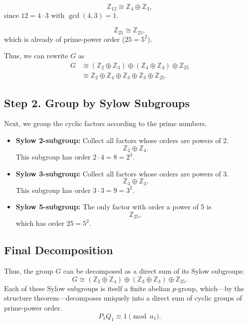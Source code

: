 \documentclass[12pt]{article}
\theoremstyle{definition} %
\theoremstyle{plain} %
\begin{document}
    \[
    \mathbb{Z}_{12} \cong \mathbb{Z}_4 \oplus \mathbb{Z}_3,
    \]
    since \(12 = 4 \cdot 3\) with \(\gcd(4,3)=1\).
    
    \[
    \mathbb{Z}_{25} \cong \mathbb{Z}_{25},
    \]
    which is already of prime-power order (\(25 = 5^2\)).
    
    Thus, we can rewrite \(G\) as
    \[
    \begin{aligned}
    G &\cong (\mathbb{Z}_2 \oplus \mathbb{Z}_3) \oplus (\mathbb{Z}_4 \oplus \mathbb{Z}_3) \oplus \mathbb{Z}_{25} \\
      &\cong \mathbb{Z}_2 \oplus \mathbb{Z}_4 \oplus \mathbb{Z}_3 \oplus \mathbb{Z}_3 \oplus \mathbb{Z}_{25}.
    \end{aligned}
    \]
    
    \subsection*{Step 2. Group by Sylow Subgroups}
    
    Next, we group the cyclic factors according to the prime numbers.
    
    \begin{itemize}
      \item \textbf{Sylow 2-subgroup:} Collect all factors whose orders are powers of 2.
        \[
        \mathbb{Z}_2 \oplus \mathbb{Z}_4.
        \]
        This subgroup has order \(2 \cdot 4 = 8 = 2^3\).
    
      \item \textbf{Sylow 3-subgroup:} Collect all factors whose orders are powers of 3.
        \[
        \mathbb{Z}_3 \oplus \mathbb{Z}_3.
        \]
        This subgroup has order \(3 \cdot 3 = 9 = 3^2\).
    
      \item \textbf{Sylow 5-subgroup:} The only factor with order a power of 5 is
        \[
        \mathbb{Z}_{25},
        \]
        which has order \(25 = 5^2\).
    \end{itemize}
    
    \subsection*{Final Decomposition}
    
    Thus, the group \(G\) can be decomposed as a direct sum of its Sylow subgroups:
    \[
    G \cong (\mathbb{Z}_2 \oplus \mathbb{Z}_4) \oplus (\mathbb{Z}_3 \oplus \mathbb{Z}_3) \oplus \mathbb{Z}_{25}.
    \]
    Each of these Sylow subgroups is itself a finite abelian \(p\)-group, which—by the structure theorem—decomposes uniquely into a direct sum of cyclic groups of prime-power order.
    \[
      P_1Q_1 \equiv 1 \pmod{a_1}.
      \]
      
\end{document}

